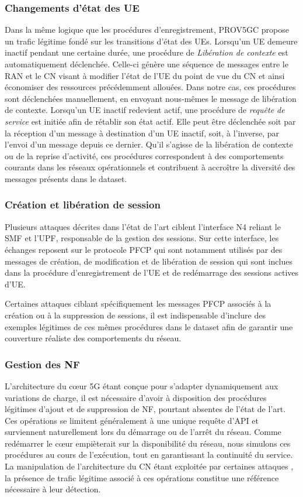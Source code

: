 \documentclass[a4paper,11pt,twoside]{StyleThese}
\begin{document}
\subsubsection{Changements d’état des UE}
Dans la même logique que les procédures d’enregistrement, PROV5GC \cite{prov5g} propose un trafic légitime fondé sur les transitions d’état des UEs. Lorsqu’un UE demeure inactif pendant une certaine durée, une procédure de \textit{Libération de contexte} est automatiquement déclenchée. Celle-ci génère une séquence de messages entre le RAN et le CN visant à modifier l’état de l’UE du point de vue du CN et ainsi économiser des ressources précédemment allouées. Dans notre cas, ces procédures sont déclenchées manuellement, en envoyant nous-mêmes le message de libération de contexte. Lorsqu’un UE inactif redevient actif, une procédure de \textit{requête de service} est initiée afin de rétablir son état actif. Elle peut être déclenchée soit par la réception d’un message à destination d’un UE inactif, soit, à l’inverse, par l’envoi d’un message depuis ce dernier. Qu’il s’agisse de la libération de contexte ou de la reprise d’activité, ces procédures correspondent à des comportements courants dans les réseaux opérationnels et contribuent à accroître la diversité des messages présents dans le dataset.

\subsubsection{Création et libération de session}
Plusieurs attaques décrites dans l’état de l’art ciblent l’interface N4 reliant le SMF et l’UPF, responsable de la gestion des sessions. Sur cette interface, les échanges reposent sur le protocole PFCP qui sont notamment utilisés par des messages de création, de modification et de libération de session qui sont inclues dans la procédure d’enregistrement de l’UE et de redémarrage des sessions actives d'UE.

Certaines attaques \cite{pfcp1} ciblant spécifiquement les messages PFCP associés à la création ou à la suppression de sessions, il est indispensable d’inclure des exemples légitimes de ces mêmes procédures dans le dataset afin de garantir une couverture réaliste des comportements du réseau.

\subsubsection{Gestion des NF}
L’architecture du cœur 5G étant conçue pour s’adapter dynamiquement aux variations de charge, il est nécessaire d'avoir à disposition des procédures légitimes d'ajout et de suppression de NF, pourtant absentes de l'état de l'art. Ces opérations se limitent généralement à une unique requête d’API et surviennent naturellement lors du démarrage ou de l’arrêt du réseau. Comme redémarrer le cœur empièterait sur la disponibilité du réseau, nous simulons ces procédures au cours de l'exécution, tout en garantissant la continuité du service. La manipulation de l’architecture du CN étant exploitée par certaines attaques \cite{5gad}, la présence de trafic légitime associé à ces opérations constitue une référence nécessaire à leur détection.
\end{document}
